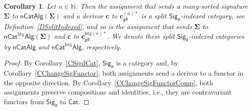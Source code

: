\documentclass[a4paper, reqno]{amsbook}
\newcommand{\sig}[1]{\mathbf{#1}}             %
\newcommand{\gd}{\mathfrak{gd}}              %
\newcommand{\htg}{\mathrm{htg}}                %
\theoremstyle{plain}
\newtheorem{corollary}[theorem]{Corollary}
\theoremstyle{definition}
\begin{document}
\begin{corollary}\label{CChangeSigIndexed}
Let $n\in\mathbb{N}$.
Then the assignment that sends a many-sorted signature $\sig{\Sigma}$ to $\mathsf{nCatAlg}(\sig{\Sigma})$ and a derivor $\mathbf{c}$ to $\mathbf{c}^{(n)\ast}_{\gd}$ is a split $\mathsf{Sig}_{\mathfrak{d}}$-indexed category, see Definition~\ref{DSplitIndexed}, and so is the assignment that sends $\sig{\Sigma}$ to $\mathsf{nCat}^{\htg}\mathsf{Alg}(\sig{\Sigma})$ and $\mathbf{c}$ to $\mathbf{c}^{\htg(n)\ast}_{\gd}$.
We denote these split $\mathsf{Sig}_{\mathfrak{d}}$-indexed categories by $\mathsf{nCatAlg}$ and $\mathsf{nCat}^{\htg}\mathsf{Alg}$, respectively.
\end{corollary}
\begin{proof}
By Corollary~\ref{CSigdCat}, $\mathsf{Sig}_{\mathfrak{d}}$ is a category and, by Corollary~\ref{CChangeSigFunctor}, both assignments send a derivor to a functor in the opposite direction.
By Corollary~\ref{CChangeSigFunctorComp}, both assignments preserve compositions and identities, i.e., they are contravariant functors from $\mathsf{Sig}_{\mathfrak{d}}$ to $\mathsf{Cat}$.
\end{proof}
\end{document}
